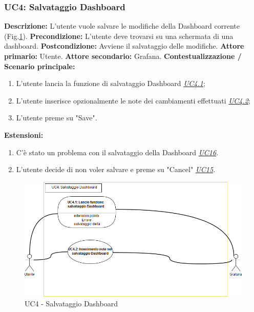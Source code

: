                     
                    
                \subsubsection{UC4: Salvataggio Dashboard}
                    \textbf{Descrizione:} L’utente vuole salvare le modifiche della Dashboard corrente (Fig.\ref{uc4}).
                    \newline
                    \textbf{Precondizione:} L'utente deve trovarsi su una schermata di una dashboard.
                    \newline
                    \textbf{Postcondizione:} Avviene il salvataggio delle modifiche.
                    \newline
                    \textbf{Attore primario:} Utente.
                    \newline
                    \textbf{Attore secondario:} Grafana.
                    \newline
                    \textbf{Contestualizzazione / Scenario principale:} \begin{enumerate}
                        \item L'utente lancia la funzione di salvataggio Dashboard \underline{\textit{UC4.1}};
                        \item L'utente inserisce opzionalmente le note dei cambiamenti effettuati \underline{\textit{UC4.2}};
                        \item L'utente preme su "Save".
                    \end{enumerate}
                    \textbf{Estensioni:} \begin{enumerate}
                            \item C’è stato un problema con il salvataggio della Dashboard \underline{\textit{UC16}}.
                            \item L'utente decide di non voler salvare e preme su "Cancel" \underline{\textit{UC15}}.
                        \end{enumerate}
                \clearpage
                \begin{figure}[!htbp]
                    	\centering
                    	\includegraphics[width=\textwidth]{UC4.png}
                    	\caption{UC4 - Salvataggio Dashboard}
                    	\label{uc4}
                    \end{figure}   
                
